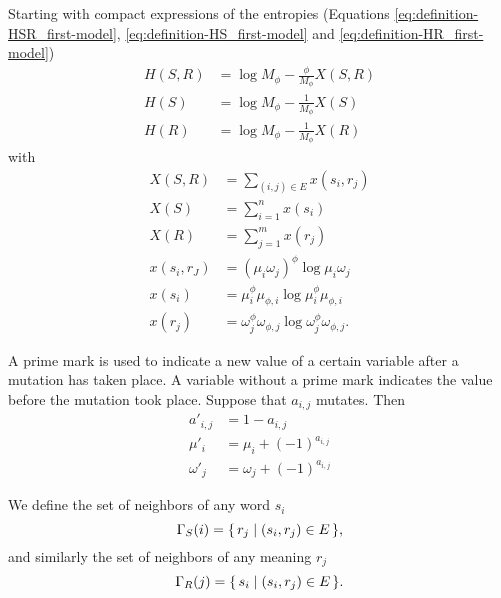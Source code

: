 Starting with compact expressions of the entropies (Equations \eqref{eq:definition-HSR_first-model}, \eqref{eq:definition-HS_first-model} and \eqref{eq:definition-HR_first-model})
\begin{align}
  \label{eq:definition-HSR_first-model_compact}
  H(S,R) &= \log M_\phi - \frac{\phi}{M_\phi} X(S,R) \\
  \label{eq:definition-HS_first-model_compact}
  H(S) &= \log M_\phi - \frac{1}{M_\phi} X(S) \\
  \label{eq:definition-HR_first-model_compact}
  H(R) &= \log M_\phi - \frac{1}{M_\phi} X(R)
\end{align}
with
\begin{align}
  \label{eq:definition-XSR_first-model_dynamic}
  X(S,R) &= \sum_{(i,j) \in E} x(s_i, r_j) \\
  \label{eq:definition-XS_first-model_dynamic}
  X(S) &= \sum_{i=1}^n x(s_i) \\
  \label{eq:definition-XR_first-model_dynamic}
  X(R) &= \sum_{j=1}^m x(r_j) \\
  \label{eq:definition-Xsirj_first-model_dynamic}
  x(s_i, r_J) &= (\mu_i\omega_j)^\phi \log \mu_i\omega_j \\
  \label{eq:definition-Xsi_first-model_dynamic}
  x(s_i) &= \mu_i^\phi \mu_{\phi,i} \log \mu_i^\phi \mu_{\phi,i} \\
  \label{eq:definition-Xrj_first-model_dynamic}
  x(r_j) &= \omega_j^\phi \omega_{\phi,j} \log \omega_j^\phi \omega_{\phi,j}.
\end{align}

A prime mark is used to indicate a new value of a certain variable after a mutation has taken place.
A variable without a prime mark indicates the value before the mutation took place.
Suppose that $a_{i,j}$ mutates.
Then
\begin{align}
  \label{eq:definition-aij_dynamic}
  a'_{i,j} &= 1 - a_{i,j} \\
  \label{eq:definition-mui_dynamic}
  \mu'_i &= \mu_i + (-1)^{a_{i,j}} \\
  \label{eq:definition-wj_dynamic}
  \omega'_j &= \omega_j + (-1)^{a_{i,j}}
\end{align}

We define the set of neighbors of any word $s_i$
\begin{equation}
  \label{eq:definition-Gamma-S}
  \Gamma_S(i) = \{\,r_j\mid(s_i,r_j) \in E\,\},
\end{equation}
and similarly the set of neighbors of any meaning $r_j$
\begin{equation}
  \label{eq:definition-Gamma-R}
  \Gamma_R(j) = \{\,s_i\mid(s_i,r_j) \in E\,\}.
\end{equation}

